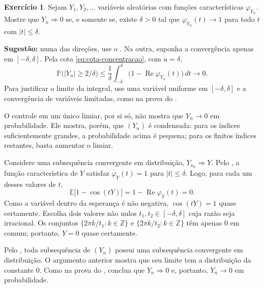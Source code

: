 \documentclass[12pt,portuguese]{article}
\theoremstyle{definition}
\theoremstyle{plainexercise}
\theoremstyle{starredexercise}
\newtheorem{starredexercise}[exercise]{Exercício}
\theoremstyle{definition}
\begin{document}
\begin{starredexercise}\label{exercise:convergencia-para-zero}
Sejam $Y_1,Y_2,\ldots$ variáveis aleatórias com funções características
$\varphi_{Y_n}$. Mostre que $Y_n\Rightarrow0$ se, e somente se, existe $\delta>0$
tal que $\varphi_{Y_n}(t)\to1$ para todo $t$ com $|t|\leqslant\delta$.

\noindent\textbf{Sugestão:} numa das direções, use o . Na outra,
suponha a convergência apenas em $[-\delta,\delta]$. Pela cota
\eqref{eq:cota-concentracao}, com $u=\delta$,
\[
\mathbb{P}\bigl(|Y_n|\geqslant2/\delta\bigr)
\leqslant\frac{1}{\delta}\int_{-\delta}^{\delta}
\bigl(1-\operatorname{Re}\varphi_{Y_n}(t)\bigr)\,dt
\longrightarrow0.
\]
Para justificar o limite da integral, use uma variável uniforme em
$[-\delta,\delta]$ e a convergência de variáveis limitadas, como na prova do
.

O controle em um único limiar, por si só, não mostra que $Y_n\to0$ em
probabilidade. Ele mostra, porém, que $(Y_n)$ é condensada: para os índices
suficientemente grandes, a probabilidade acima é pequena; para os finitos
índices restantes, basta aumentar o limiar.

Considere uma subsequência convergente em distribuição,
$Y_{n_k}\Rightarrow Y$. Pelo , a função característica
de $Y$ satisfaz $\varphi_Y(t)=1$ para $|t|\leqslant\delta$. Logo, para cada
um desses valores de $t$,
\[
\mathbb{E}\bigl[1-\cos(tY)\bigr]=1-\operatorname{Re}\varphi_Y(t)=0.
\]
Como a variável dentro da esperança é não negativa, $\cos(tY)=1$ quase
certamente. Escolha dois valores não nulos $t_1,t_2\in[-\delta,\delta]$ cuja
razão seja irracional. Os conjuntos
$\{2\pi k/t_1:k\in\mathbb{Z}\}$ e $\{2\pi k/t_2:k\in\mathbb{Z}\}$ têm apenas
$0$ em comum; portanto, $Y=0$ quase certamente.

Pelo , toda subsequência de $(Y_n)$ possui uma
subsequência convergente em distribuição. O argumento anterior mostra que
seu limite tem a distribuição da constante $0$. Como na prova do
, conclua que $Y_n\Rightarrow0$ e, portanto,
$Y_n\to0$ em probabilidade.
\end{starredexercise}
\end{document}
